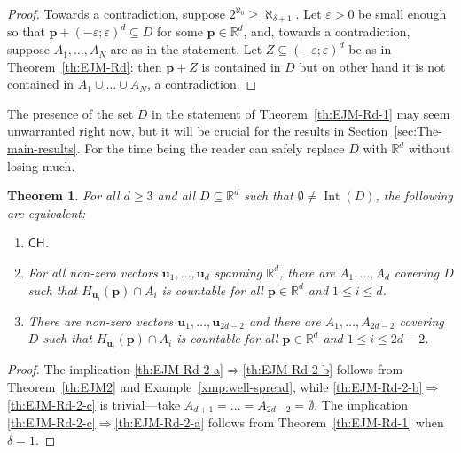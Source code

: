 \documentclass[12pt]{amsart}
\newcommand{\CH}{{\mathsf{CH}}}	%
\DeclareMathOperator{\Int}{Int} 		%
\newcommand{\R}{\mathbb{R}}	%
\newcommand{\IMPLIES}{\Rightarrow }
\theoremstyle{plain}
\newtheorem{theorem}{Theorem}[section]
\theoremstyle{definition}
\theoremstyle{remark}
\begin{document}
\begin{proof}
Towards a contradiction, suppose \( 2^{\aleph_0} \geq \aleph_{ \delta + 1 } \).
Let \( \varepsilon > 0 \) be small enough so that \( \mathbf{p} + ( - \varepsilon ; \varepsilon )^d \subseteq D \) for some \( \mathbf{p} \in \R^d \), and, towards a contradiction, suppose \( A_1 , \dots , A_N \) are as in the statement.
Let \( Z \subseteq ( - \varepsilon ; \varepsilon )^d \) be as in Theorem~\ref{th:EJM-Rd}: then \( \mathbf{p} + Z \) is contained in \( D \) but on other hand it is not contained in \( A_1 \cup \dots \cup A_N \), a contradiction.
\end{proof}

The presence of the set \( D \) in the statement of Theorem~\ref{th:EJM-Rd-1} may seem unwarranted right now, but it will be crucial for the results in Section~\ref{sec:The-main-results}.
For the time being the reader can safely replace \( D \) with \( \R^d \) without losing much.

\begin{theorem}\label{th:EJM-Rd-2}
For all \( d \geq 3 \) and all \( D \subseteq \R^d \) such that \( \emptyset \neq \Int ( D ) \), the following are equivalent:
\begin{enumerate}[label={\upshape (\alph*)}]
\item\label{th:EJM-Rd-2-a}
\( \CH \).
\item\label{th:EJM-Rd-2-b}
For all non-zero vectors \( \mathbf{u}_1 , \dots , \mathbf{u}_d \) spanning \( \R^d \), there are \( A_1 , \dots , A_d \) covering \( D \) such that \( H_{ \mathbf{u}_i } ( \mathbf{p} ) \cap A_i \) is countable for all \( \mathbf{p} \in \R^d \) and \( 1 \leq i \leq d \).
\item\label{th:EJM-Rd-2-c}
There are non-zero vectors \( \mathbf{u}_1 , \dots , \mathbf{u}_{ 2 d - 2 } \) and there are \( A_1 , \dots , A_{ 2 d - 2 } \) covering \( D \) such that \( H_{ \mathbf{u}_i } ( \mathbf{p} ) \cap A_i \) is countable for all \( \mathbf{p} \in \R^d \) and \( 1 \leq i \leq 2 d - 2 \).
\end{enumerate} 
\end{theorem}

\begin{proof}
The implication \ref{th:EJM-Rd-2-a}\( \IMPLIES \)\ref{th:EJM-Rd-2-b} follows from Theorem~\ref{th:EJM2} and Example~\ref{xmp:well-spread}, while \ref{th:EJM-Rd-2-b}\( \IMPLIES \)\ref{th:EJM-Rd-2-c} is trivial---take \( A_{ d + 1 } = \dots = A_{ 2 d - 2 } = \emptyset \).
The implication \ref{th:EJM-Rd-2-c}\( \IMPLIES \)\ref{th:EJM-Rd-2-a} follows from Theorem~\ref{th:EJM-Rd-1} when \( \delta = 1 \).
\end{proof}
\end{document}
